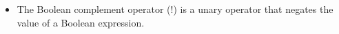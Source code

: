 
\begin{flushleft}
	
	\begin{itemize}
		\item The Boolean complement operator (!) is a unary operator that negates the value of a Boolean expression. 
		\bigskip
		\bigskip
		
	\end{itemize}
	
\end{flushleft}
\newpage